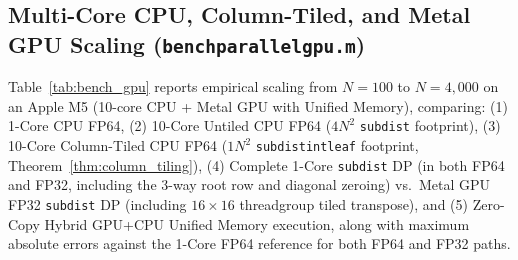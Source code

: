 \documentclass[11pt,a4paper]{article}
\makeatletter
\DeclareRobustCommand{\_}{\ifmmode\nfss@text{\textunderscore}\else\textunderscore\allowbreak\fi}
\theoremstyle{definition}
\makeatother
\begin{document}
\subsection{Multi-Core CPU, Column-Tiled, and Metal GPU Scaling (\texttt{bench\_parallel\_gpu.m})}
Table~\ref{tab:bench_gpu} reports empirical scaling from $N = 100$ to $N = 4{,}000$ on an Apple M5 (10-core CPU + Metal GPU with Unified Memory), comparing: (1) 1-Core CPU FP64, (2) 10-Core Untiled CPU FP64 ($4N^2$ \texttt{subdist} footprint), (3) 10-Core Column-Tiled CPU FP64 ($1N^2$ \texttt{subdist\_int\_leaf} footprint, Theorem~\ref{thm:column_tiling}), (4) Complete 1-Core \texttt{subdist} DP (in both FP64 and FP32, including the 3-way root row and diagonal zeroing) vs.\ Metal GPU FP32 \texttt{subdist} DP (including $16 \times 16$ threadgroup tiled transpose), and (5) Zero-Copy Hybrid GPU+CPU Unified Memory execution, along with maximum absolute errors against the 1-Core FP64 reference for both FP64 and FP32 paths.
\end{document}
